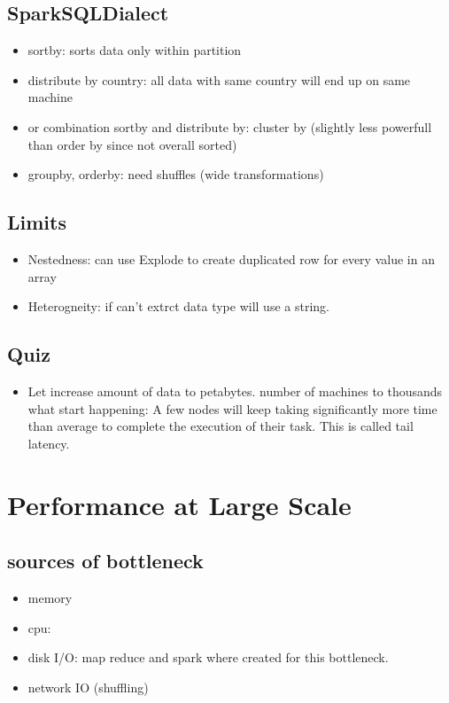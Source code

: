 \subsection{SparkSQLDialect}
\begin{itemize}
    \item sortby: sorts data only within partition
    \item distribute by country: all data with same country will end up on same machine
    \item or combination sortby and distribute by: cluster by (slightly less powerfull than order by since not overall sorted)
    \item groupby, orderby: need shuffles (wide transformations)
\end{itemize}


\subsection{Limits}
\begin{itemize}
    \item Nestedness: can use Explode to create duplicated row for every value in an array
    \item Heterogneity: if can't extrct data type will use a string.
\end{itemize}

\subsection{Quiz}
\begin{itemize}
    \item Let increase amount of data to petabytes. number of machines to thousands what start happening:
    A few nodes will keep taking significantly more time than average to complete the execution of their task.
    This is called tail latency.
\end{itemize}



\section{Performance at Large Scale}
\subsection{sources of bottleneck}
\begin{itemize}
    \item memory
    \item cpu:
    \item disk I/O: map reduce and spark where created for this bottleneck.
    \item network IO (shuffling)
\end{itemize}

